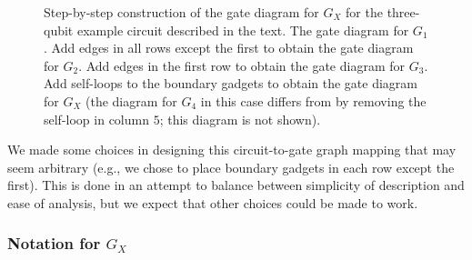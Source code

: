 \documentclass[../thesis-main/thesis-main]{subfiles}
\begin{document}

\begin{figure}
\centering {} 




\caption{Step-by-step construction of the gate diagram for $G_X$ for the three-qubit example circuit described in the text. 
 The gate diagram for $G_{1}$.
 Add edges in all rows except the first to obtain the gate diagram for $G_{2}$.
 Add edges in the first row to obtain the gate diagram for $G_{3}$.
 Add self-loops to the boundary gadgets to obtain the gate diagram for $G_X$ (the diagram for $G_{4}$ in this case differs from  by removing the self-loop in column $5$; this diagram is not shown).
\label{fig:step-by-step}
}
\end{figure}

We made some choices in designing this circuit-to-gate graph mapping that may seem arbitrary (e.g., we chose to place boundary gadgets in each row except the first). This is done in an attempt to balance between simplicity of description and ease of analysis, but we expect that other choices could be made to work.

\subsubsection{Notation for $G_X$}
\end{document}
